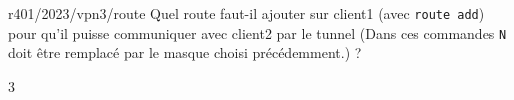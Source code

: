 \begin{question}{r401/2023/vpn3/route}
  Quel route faut-il ajouter sur client1 (avec {\tt route add}) pour
  qu'il puisse communiquer avec client2 par le tunnel (Dans ces
  commandes \texttt{N} doit être remplacé par le masque choisi
  précédemment.) ?
  \begin{multicols}{3}
    \begin{reponses}
      
      
      
      
      
      
    \end{reponses}
  \end{multicols}
\end{question}
